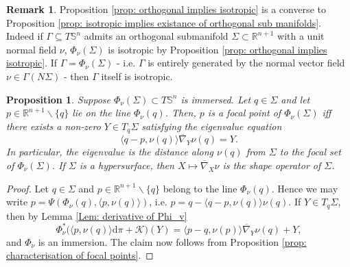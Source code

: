 \documentclass[12pt]{amsart}
\theoremstyle{plain}
\newtheorem{Prop}{Proposition}
\theoremstyle{definition}
\newtheorem{Rem}{Remark}
\def\S{\mathbb{S}}
\newcommand{\td}{\mathrm{d}}
\numberwithin{equation}{section}
\begin{document}
\begin{Rem}
    Proposition \ref{prop: orthogonal implies isotropic} is a converse to Proposition \ref{prop: isotropic implies existance of orthogonal sub manifolds}. Indeed if $\Gamma\subseteq T\S^n$ admits an orthogonal submanifold $\Sigma\subset\mathbb{R}^{n+1}$ with a unit normal field $\nu$, $\Phi_\nu(\Sigma)$ is isotropic by Proposition \ref{prop: orthogonal implies isotropic}. If $\Gamma=\Phi_\nu(\Sigma)$ - i.e. $\Gamma$ is entirely generated by the normal vector field $\nu\in\Gamma(N\Sigma)$ - then $\Gamma$ itself is isotropic.
\end{Rem}
\begin{Prop} \label{Prop: orthgononal submanifolds distance from focal set is radii of curvature}
 Suppose $\Phi_\nu(\Sigma)\subset T\S^n$ is immersed. Let $q\in \Sigma$ and let $p\in\mathbb{R}^{n+1}\backslash\{q\}$ lie on the line $\Phi_\nu(q)$. Then, $p$ is a focal point of $\Phi_\nu(\Sigma)$ iff there exists a non-zero $Y\in T_q\Sigma$ satisfying the eigenvalue equation
 \[
 \langle q-p,\nu(q)\rangle \overline\nabla_Y \nu(q)=Y.
 \]
 In particular, the eigenvalue is the distance along $\nu(q)$ from $\Sigma$ to the focal set of $\Phi_\nu(\Sigma)$. If $\Sigma$ is a hypersurface, then $X\mapsto \overline{\nabla}_X\nu$ is the shape operator of $\Sigma$.
\end{Prop}
\begin{proof}
Let $q\in \Sigma$ and $p\in\mathbb{R}^{n+1}\backslash\{q\}$ belong to the line $\Phi_\nu(q)$. Hence we may write $p=\Psi(\Phi_\nu(q),\langle p,\nu(q)\rangle)$, i.e. $p=q-\langle q-p,\nu(q)\rangle \nu(q)$.
If $Y\in T_q\Sigma$, then by Lemma \ref{Lem: derivative of Phi_v}
\[
\Phi^\ast_\nu\Big(\langle p,\nu(q)\rangle\td\pi+\mathcal{K}\Big)(Y)=\langle p-q,\nu(p)\rangle\overline\nabla_Y\nu(q)+Y,
\]
and $\Phi_\nu$ is an immersion. The claim now follows from Proposition \ref{prop: characterisation of focal points}.
\end{proof}
\end{document}
